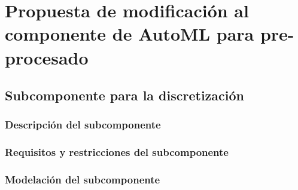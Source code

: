 \chapter{Propuesta de modificación al componente de AutoML para pre-procesado}\label{chap:2}



\section{Subcomponente para la discretización}
\subsection{Descripción del subcomponente}
\subsection{Requisitos y restricciones del subcomponente}
\subsection{Modelación del subcomponente}




